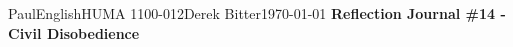 \documentclass[12pt,letterpaper]{article}
\begin{document}
\begin{mla}{Paul}{English}{HUMA 1100-012}{Derek
    Bitter}{\today}    
    {\textbf{Reflection Journal \#14 - Civil Disobedience}}

\section*{}


\end{mla}
\end{document}
